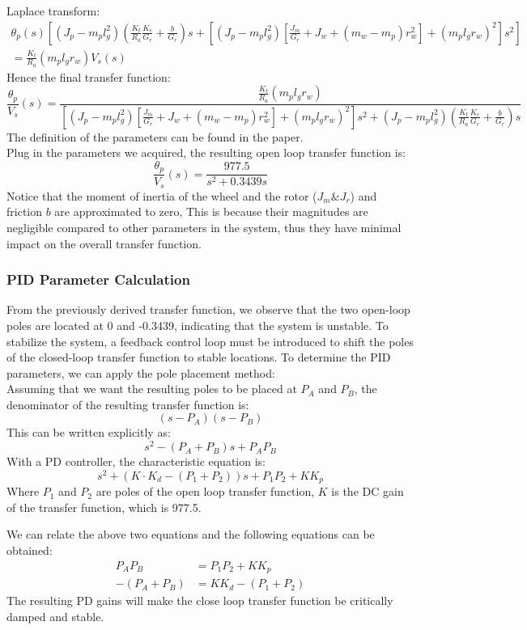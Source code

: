 \documentclass{article}
\begin{document}
Laplace transform:
\begin{multline*}
\theta_p(s) \left[ (J_p - m_p l_g^2) \left( \frac{K_t}{R_a} \frac{K_e}{G_r} + \frac{b}{G_r} \right) s + \left[ (J_p - m_p l_g^2) \left[ \frac{J_m}{G_r} + J_w + (m_w - m_p) r_w^2 \right] + (m_p l_g r_w)^2 \right] s^2 \right]
\\= \frac{K_t}{R_a} (m_p l_g r_w) V_s(s)
\end{multline*}
Hence the final transfer function:
\[
\frac{\theta_p}{V_s}(s) = \frac{\frac{K_t}{R_a} (m_p l_g r_w)}{\left[ (J_p - m_p l_g^2) \left[ \frac{J_m}{G_r} + J_w + (m_w - m_p) r_w^2 \right] + (m_p l_g r_w)^2 \right] s^2 + (J_p - m_p l_g^2) \left( \frac{K_t}{R_a} \frac{K_e}{G_r} + \frac{b}{G_r} \right) s}
\]
The definition of the parameters can be found in the paper. \\

Plug in the parameters we acquired, the resulting open loop transfer function is:
\[
\frac{\theta_p}{V_s}(s) = \frac{977.5}{s^2+0.3439s}
\]
Notice that the moment of inertia of the wheel and the rotor ($J_m \& J_r$) and
friction $b$ are approximated to zero, This is because their magnitudes are
negligible compared to other parameters in the system, thus they have
minimal impact on the overall transfer function.

\subsubsection{PID Parameter Calculation}

From the previously derived transfer function, we observe that the two open-loop
poles are located at 0 and -0.3439, indicating that the system is unstable. To
stabilize the system, a feedback control loop must be introduced to shift the
poles of the closed-loop transfer function to stable locations. To determine the
PID parameters, we can apply the pole placement method: \\

Assuming that we want the resulting poles to be placed at $P_A$ and $P_B$, the
denominator of the resulting transfer function is:
\[
(s-P_A)(s-P_B)
\]
This can be written explicitly as:
\[
s^2 - (P_A + P_B)s + P_AP_B
\]
With a PD controller, the characteristic equation is:
\[
s^2 + (K \cdot K_d - (P_1 + P_2))s + P_1P_2 + KK_p
\]
Where $P_1$ and $P_2$ are poles of the open loop transfer function, $K$ is the
DC gain of the transfer function, which is 977.5.

We can relate the above two equations and the following equations can be obtained:
\begin{align*}
    P_AP_B &=  P_1P_2 + KK_p\\
    -(P_A + P_B) &= KK_d - (P_1 + P_2)
\end{align*}
The resulting PD gains will make the close loop transfer function be critically
damped and stable.
\end{document}
